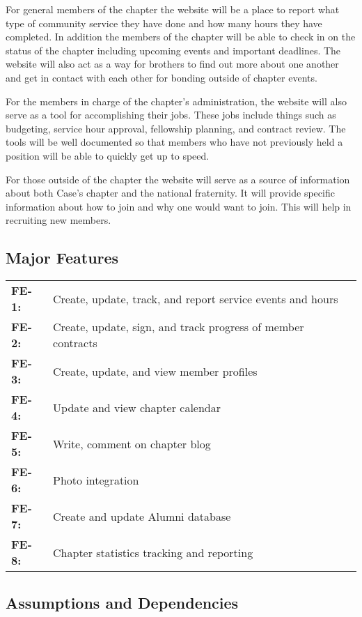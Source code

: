 \documentclass[11pt,letterpaper,rotate]{article}
\begin{document}
For general members of the chapter the website will be a place to report what type of community service they have done and how many hours they have completed. In addition the members of the chapter will be able to check in on the status of the chapter including upcoming events and important deadlines. The website will also act as a way for brothers to find out more about one another and get in contact with each other for bonding outside of chapter events.

For the members in charge of the chapter's administration, the website will also serve as a tool for accomplishing their jobs. These jobs include things such as budgeting, service hour approval, fellowship planning, and contract review. The tools will be well documented so that members who have not previously held a position will be able to quickly get up to speed.

For those outside of the chapter the website will serve as a source of information about both Case's chapter and the national fraternity. It will provide specific information about how to join and why one would want to join. This will help in recruiting new members.

\subsection{Major Features}

\begin{longtable}{lp{12cm}}
{\bf FE-1:} & Create, update, track, and report service events and
hours \\
{\bf FE-2:} &Create, update, sign, and track progress of member
contracts \\
{\bf FE-3: } &Create, update, and view member profiles\\
{\bf FE-4: } &Update and view chapter calendar\\
{\bf FE-5: } &Write, comment on chapter blog\\
{\bf FE-6: } &Photo integration\\
{\bf FE-7: } &Create and update Alumni database\\
{\bf FE-8: } &Chapter statistics tracking and reporting\\
\end{longtable}


\subsection{Assumptions and Dependencies}
\end{document}
